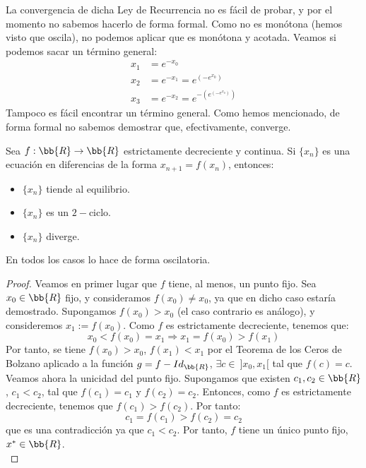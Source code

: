 \begin{ejemplo}
    La convergencia de dicha Ley de Recurrencia no es fácil de probar, y por el momento no sabemos hacerlo de forma formal. Como no es monótona (hemos visto que oscila), no podemos aplicar que es monótona y acotada. Veamos si podemos sacar un término general:
    \begin{align*}
        x_1 &= e^{-x_0}\\
        x_2 &= e^{-x_1} = e^{(-e^{x_0})}\\
        x_3 &= e^{-x_2} = e^{-(e^{(-e^{x_0})})}
    \end{align*}
    Tampoco es fácil encontrar un término general. Como hemos mencionado, de forma formal no sabemos demostrar que, efectivamente, converge.
\end{ejemplo}

\begin{ejercicio*}\label{ej:decreciente_cont}
    Sea $f:\bb{R}\to \bb{R}$ estrictamente decreciente y continua. Si $\{x_n\}$ es una ecuación en diferencias de la forma $x_{n+1}=f(x_n)$, entonces:
    \begin{itemize}
        \item $\{x_n\}$ tiende al equilibrio.
        \item $\{x_n\}$ es un $2-$ciclo.
        \item $\{x_n\}$ diverge.
    \end{itemize}
    En todos los casos lo hace de forma oscilatoria.

    \begin{proof}
        Veamos en primer lugar que $f$ tiene, al menos, un punto fijo. Sea $x_0\in \bb{R}$ fijo, y consideramos $f(x_0)\neq x_0$, ya que en dicho caso estaría demostrado.
    Supongamos $f(x_0)>x_0$ (el caso contrario es análogo), y consideremos $x_1:=f(x_0)$. Como $f$ es estrictamente decreciente, tenemos que:
    \begin{equation*}
        x_0<f(x_0)=x_1 \Longrightarrow x_1=f(x_0)>f(x_1)
    \end{equation*}
    Por tanto, se tiene $f(x_0)>x_0$, $f(x_1)<x_1$ por el Teorema de los Ceros de Bolzano
    aplicado a la función $g=f-Id_{\bb{R}}$, $\exists c\in~]x_0,x_1[$ tal que $f(c)=c$.\\

    Veamos ahora la unicidad del punto fijo. Supongamos que existen $c_1,c_2\in \bb{R}$, $c_1<c_2$, tal que $f(c_1)=c_1$ y $f(c_2)=c_2$. Entonces, como $f$ es estrictamente decreciente, tenemos que $f(c_1)>f(c_2)$. Por tanto:
    \begin{equation*}
        c_1=f(c_1)>f(c_2)=c_2
    \end{equation*}
    que es una contradicción ya que $c_1<c_2$. Por tanto, $f$ tiene un único punto fijo, $x^\ast\in \bb{R}$.\\
    

\end{proof}
\end{ejercicio*}

